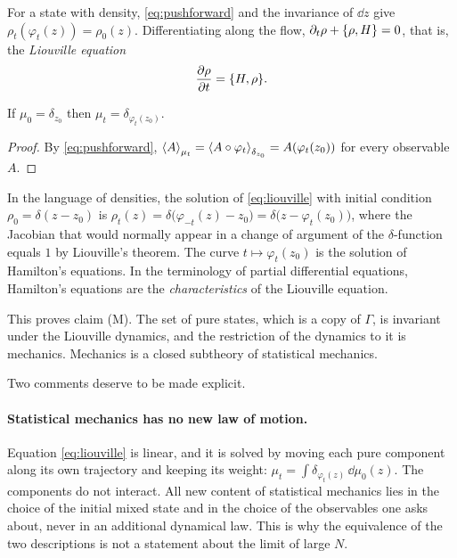 For a state with density, \eqref{eq:pushforward} and the invariance of $\dd z$ give $\rho_t(\varphi_t(z))=\rho_0(z)$. Differentiating along the flow, $\partial_t\rho+\{\rho,H\}=0$, that is, the \emph{Liouville equation}
\begin{equation}
\frac{\partial\rho}{\partial t}=\{H,\rho\}.
\label{eq:liouville}
\end{equation}

\begin{proposition}\label{prop:pure-stays-pure}
If $\mu_0=\delta_{z_0}$ then $\mu_t=\delta_{\varphi_t(z_0)}$.
\end{proposition}

\begin{proof}
By \eqref{eq:pushforward}, $\left\langle A\right\rangle_{\mu_t}=\left\langle A\circ\varphi_t\right\rangle_{\delta_{z_0}}=A(\varphi_t(z_0))$ for every observable $A$.
\end{proof}

In the language of densities, the solution of \eqref{eq:liouville} with initial condition $\rho_0=\delta(z-z_0)$ is $\rho_t(z)=\delta\bigl(\varphi_{-t}(z)-z_0\bigr)=\delta\bigl(z-\varphi_t(z_0)\bigr)$, where the Jacobian that would normally appear in a change of argument of the $\delta$-function equals $1$ by Liouville's theorem. The curve $t\mapsto\varphi_t(z_0)$ is the solution of Hamilton's equations. In the terminology of partial differential equations, Hamilton's equations are the \emph{characteristics} of the Liouville equation.

This proves claim (M). The set of pure states, which is a copy of $\Gamma$, is invariant under the Liouville dynamics, and the restriction of the dynamics to it is mechanics. Mechanics is a closed subtheory of statistical mechanics.

Two comments deserve to be made explicit.

\paragraph{Statistical mechanics has no new law of motion.} Equation \eqref{eq:liouville} is linear, and it is solved by moving each pure component along its own trajectory and keeping its weight: $\mu_t=\int\delta_{\varphi_t(z)}\,\dd\mu_0(z)$. The components do not interact. All new content of statistical mechanics lies in the choice of the initial mixed state and in the choice of the observables one asks about, never in an additional dynamical law. This is why the equivalence of the two descriptions is not a statement about the limit of large $N$.

